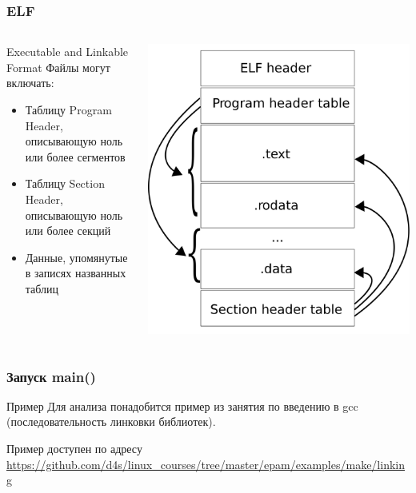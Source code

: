
\begin{frame}
	\frametitle{ELF}
	\begin{columns}
			\begin{block}{Executable and Linkable Format}
				Файлы могут включать:
				\begin{itemize}
					\item Таблицу Program Header,  описывающую ноль или более сегментов
					\item Таблицу Section Header,  описывающую ноль или более секций
					\item Данные,  упомянутые в записях названных таблиц
				\end{itemize}
			\end{block}
			\includegraphics[height=0.8\textheight]{../../slides/elf-analysis/Elf-layout.png}
	\end{columns}
\end{frame}

\begin{frame}
	\frametitle{Запуск main()}

	\begin{block}{Пример}
		Для анализа понадобится пример из занятия по введению в gcc (последовательность линковки библиотек).
	\end{block}

	Пример доступен по адресу \url{https://github.com/d4s/linux\_courses/tree/master/epam/examples/make/linking}
	
\end{frame}

